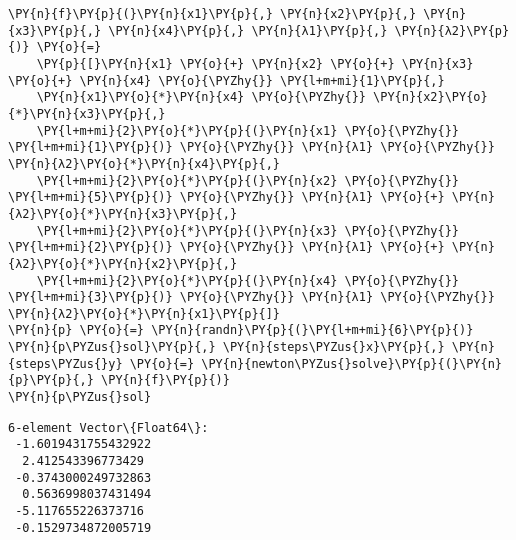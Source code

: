     \begin{tcolorbox}[breakable, size=fbox, boxrule=1pt, pad at break*=1mm,colback=cellbackground, colframe=cellborder]
\begin{Verbatim}[commandchars=\\\{\}]
\PY{n}{f}\PY{p}{(}\PY{n}{x1}\PY{p}{,} \PY{n}{x2}\PY{p}{,} \PY{n}{x3}\PY{p}{,} \PY{n}{x4}\PY{p}{,} \PY{n}{λ1}\PY{p}{,} \PY{n}{λ2}\PY{p}{)} \PY{o}{=} 
    \PY{p}{[}\PY{n}{x1} \PY{o}{+} \PY{n}{x2} \PY{o}{+} \PY{n}{x3} \PY{o}{+} \PY{n}{x4} \PY{o}{\PYZhy{}} \PY{l+m+mi}{1}\PY{p}{,} 
    \PY{n}{x1}\PY{o}{*}\PY{n}{x4} \PY{o}{\PYZhy{}} \PY{n}{x2}\PY{o}{*}\PY{n}{x3}\PY{p}{,} 
    \PY{l+m+mi}{2}\PY{o}{*}\PY{p}{(}\PY{n}{x1} \PY{o}{\PYZhy{}} \PY{l+m+mi}{1}\PY{p}{)} \PY{o}{\PYZhy{}} \PY{n}{λ1} \PY{o}{\PYZhy{}} \PY{n}{λ2}\PY{o}{*}\PY{n}{x4}\PY{p}{,} 
    \PY{l+m+mi}{2}\PY{o}{*}\PY{p}{(}\PY{n}{x2} \PY{o}{\PYZhy{}} \PY{l+m+mi}{5}\PY{p}{)} \PY{o}{\PYZhy{}} \PY{n}{λ1} \PY{o}{+} \PY{n}{λ2}\PY{o}{*}\PY{n}{x3}\PY{p}{,} 
    \PY{l+m+mi}{2}\PY{o}{*}\PY{p}{(}\PY{n}{x3} \PY{o}{\PYZhy{}} \PY{l+m+mi}{2}\PY{p}{)} \PY{o}{\PYZhy{}} \PY{n}{λ1} \PY{o}{+} \PY{n}{λ2}\PY{o}{*}\PY{n}{x2}\PY{p}{,} 
    \PY{l+m+mi}{2}\PY{o}{*}\PY{p}{(}\PY{n}{x4} \PY{o}{\PYZhy{}} \PY{l+m+mi}{3}\PY{p}{)} \PY{o}{\PYZhy{}} \PY{n}{λ1} \PY{o}{\PYZhy{}} \PY{n}{λ2}\PY{o}{*}\PY{n}{x1}\PY{p}{]}
\PY{n}{p} \PY{o}{=} \PY{n}{randn}\PY{p}{(}\PY{l+m+mi}{6}\PY{p}{)}
\PY{n}{p\PYZus{}sol}\PY{p}{,} \PY{n}{steps\PYZus{}x}\PY{p}{,} \PY{n}{steps\PYZus{}y} \PY{o}{=} \PY{n}{newton\PYZus{}solve}\PY{p}{(}\PY{n}{p}\PY{p}{,} \PY{n}{f}\PY{p}{)}
\PY{n}{p\PYZus{}sol}
\end{Verbatim}
\end{tcolorbox}

            \begin{tcolorbox}[breakable, size=fbox, boxrule=.5pt, pad at break*=1mm, opacityfill=0]
\begin{Verbatim}[commandchars=\\\{\}]
6-element Vector\{Float64\}:
 -1.6019431755432922
  2.412543396773429
 -0.3743000249732863
  0.5636998037431494
 -5.117655226373716
 -0.1529734872005719
\end{Verbatim}
\end{tcolorbox}
